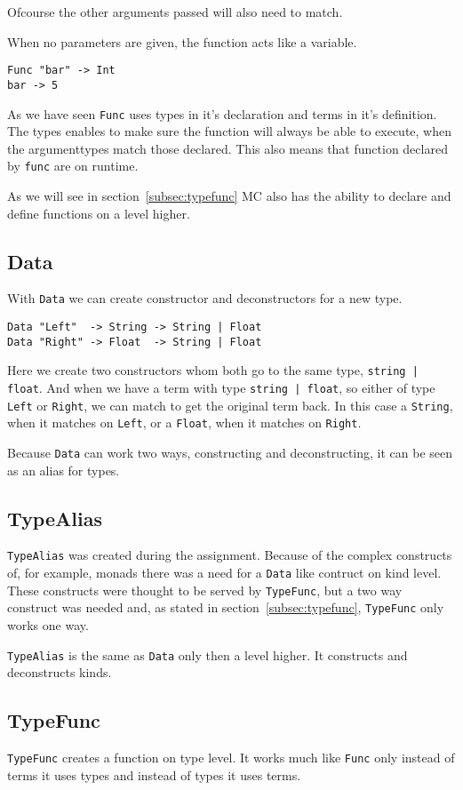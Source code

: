 Ofcourse the other arguments passed will also need to match.

When no parameters are given, the function acts like a variable.
\begin{lstlisting}
Func "bar" -> Int
bar -> 5
\end{lstlisting}

As we have seen \verb|Func| uses types in it's declaration and terms in it's definition.
The types enables to make sure the function will always be able to execute, when the argumenttypes match those declared.
This also means that function declared by \verb|func| are on runtime.

As we will see in section~\ref{subsec:typefunc} MC also has the ability to declare and define functions on a level higher.

\subsection{Data}
With \verb|Data| we can create constructor and deconstructors for a new type.
\begin{lstlisting}
Data "Left"  -> String -> String | Float
Data "Right" -> Float  -> String | Float
\end{lstlisting}
Here we create two constructors whom both go to the same type, \verb_string | float_.
And when we have a term with type \verb_string | float_, so either of type \verb|Left| or \verb|Right|, we can match to get the original term back.
In this case a \verb|String|, when it matches on \verb|Left|, or a \verb|Float|, when it matches on \verb|Right|.

Because \verb|Data| can work two ways, constructing and deconstructing, it can be seen as an alias for types.

\subsection{TypeAlias}
\verb|TypeAlias| was created during the assignment.
Because of the complex constructs of, for example, monads there was a need for a \verb|Data| like contruct on kind level.
These constructs were thought to be served by \verb|TypeFunc|, but a two way construct was needed and, as stated in section~\ref{subsec:typefunc}, \verb|TypeFunc| only works one way.

\verb|TypeAlias| is the same as \verb|Data| only then a level higher.
It constructs and deconstructs kinds.

\subsection{TypeFunc}
\verb|TypeFunc| creates a function on type level.
It works much like \verb|Func| only instead of terms it uses types and instead of types it uses terms.

